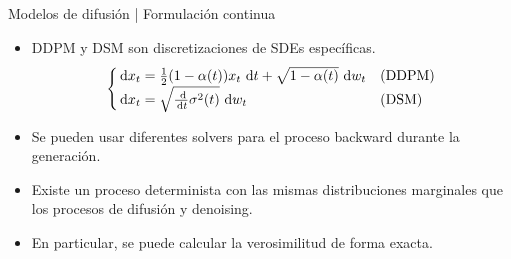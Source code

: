 \documentclass[aspectratio=43, 10pt]{beamer} %
\begin{document}
\begin{frame}{Modelos de difusión | Formulación continua}
    \begin{itemize}
        \item<1> DDPM y DSM son discretizaciones de SDEs específicas.
              {
                  \begin{equation*}
                      \begin{cases}
                          \,\operatorname{d}\! x_t = \frac{1}{2}(1-\alpha(t))x_t \,\operatorname{d}\! t + \sqrt{1-\alpha(t)}\,\operatorname{d}\! w_t & \text{(DDPM)} \\
                          \,\operatorname{d}\! x_t = \sqrt{\frac{\,\operatorname{d}\!}{\,\operatorname{d}\! t}\sigma^2(t)}\,\operatorname{d}\! w_t                     & \text{(DSM)}
                      \end{cases}
                  \end{equation*}
              }
        \item<2> Se pueden usar diferentes solvers para el proceso backward durante la generación.
        \item<3> Existe un proceso determinista con las mismas distribuciones marginales que los procesos de difusión y denoising.
        \item<4> En particular, se puede calcular la verosimilitud de forma exacta.
    \end{itemize}
\end{frame}
\end{document}
